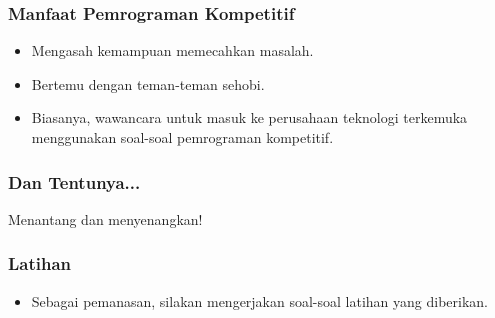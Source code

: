 \begin{frame}
\frametitle{Manfaat Pemrograman Kompetitif}
\begin{itemize}
  \item Mengasah kemampuan memecahkan masalah.
  \item Bertemu dengan teman-teman sehobi.
  \item Biasanya, wawancara untuk masuk ke perusahaan teknologi terkemuka menggunakan soal-soal pemrograman kompetitif.
\end{itemize}
\end{frame}

\begin{frame}
\frametitle{Dan Tentunya...}
\begin{center}
  {\LARGE Menantang dan menyenangkan!}
\end{center}
\end{frame}

\begin{frame}
\frametitle{Latihan}
\begin{itemize}
  \item Sebagai pemanasan, silakan mengerjakan soal-soal latihan yang diberikan.
\end{itemize}
\end{frame}


